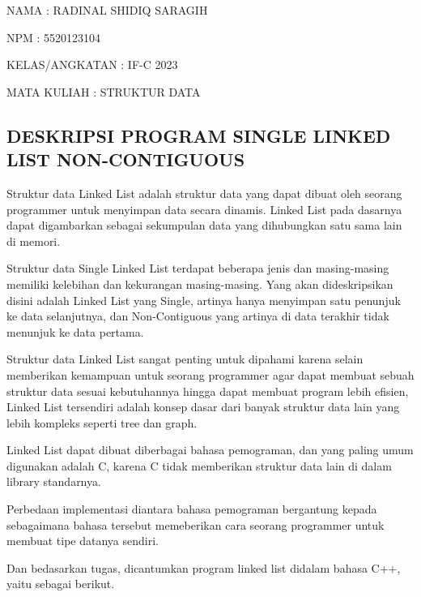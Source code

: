 \documentclass[12pt, a4paper]{article}
\date{}
\begin{document}
  \begin{flushleft}
    NAMA           : RADINAL SHIDIQ SARAGIH

    NPM            : 5520123104

    KELAS/ANGKATAN : IF-C 2023

    MATA KULIAH    : STRUKTUR DATA
  \end{flushleft}

  \begin{center}
    \section*{DESKRIPSI PROGRAM SINGLE LINKED LIST NON-CONTIGUOUS}
  \end{center}

  \vspace{0.5cm}

  Struktur data Linked List adalah struktur data yang dapat dibuat oleh seorang
  programmer untuk menyimpan data secara dinamis. Linked List pada dasarnya dapat
  digambarkan sebagai sekumpulan data yang dihubungkan satu sama lain di memori.

  Struktur data Single Linked List terdapat beberapa jenis dan masing-masing memiliki
  kelebihan dan kekurangan masing-masing. Yang akan dideskripsikan disini adalah
  Linked List yang Single, artinya hanya menyimpan satu penunjuk ke data selanjutnya,
  dan Non-Contiguous yang artinya di data terakhir tidak menunjuk ke data pertama.

  Struktur data Linked List sangat penting untuk dipahami karena selain memberikan
  kemampuan untuk seorang programmer agar dapat membuat sebuah struktur data sesuai
  kebutuhannya hingga dapat membuat program lebih efisien, Linked List tersendiri
  adalah konsep dasar dari banyak struktur data lain yang lebih kompleks seperti
  tree dan graph.

  Linked List dapat dibuat diberbagai bahasa pemograman, dan yang paling umum digunakan
  adalah C, karena C tidak memberikan struktur data lain di dalam library standarnya.

  Perbedaan implementasi diantara bahasa pemograman bergantung kepada sebagaimana
  bahasa tersebut memeberikan cara seorang programmer untuk membuat tipe datanya
  sendiri.

  Dan bedasarkan tugas, dicantumkan program linked list didalam bahasa C++, yaitu sebagai berikut.

  \vspace{0.5cm}
  
  \vspace{0.5cm}
\end{document}
